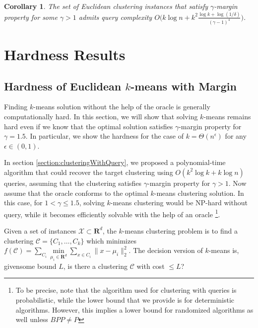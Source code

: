 \documentclass{article}
\newcommand{\mc}{\mathcal}
\newcommand{\mb}{\mathbf}
\newtheorem{corollary}[theorem]{Corollary}
\begin{document}
\begin{corollary}
The set of Euclidean clustering instances that satisfy $\gamma$-margin property for some $\gamma > 1$ admits query complexity $O\big(k\log n + k^2\frac{\log k + \log (1/\delta)}{(\gamma - 1)^4}\big)$. 
\end{corollary}

\section{Hardness Results}
\label{section:lowerBounds}

\subsection{Hardness of Euclidean $k$-means with Margin}

Finding $k$-means solution without the help of the oracle is generally computationally hard. In this section, we will show that solving $k$-means remains hard even if we know that the optimal solution satisfies $\gamma$-margin property for $\gamma=1.5$. In particular, we show the hardness for the case of $k=\Theta(n^\epsilon)$ for any $\epsilon\in (0,1)$. 

In section \ref{section:clusteringWithQuery}, we proposed a polynomial-time algorithm that could recover the target clustering using $O(k^2\log k +k\log n)$ queries, assuming that the clustering satisfies $\gamma$-margin property for $\gamma>1$. Now assume that the oracle conforms to the optimal $k$-means clustering solution. In this case, for $1<\gamma\le 1.5$, solving $k$-means clustering would be NP-hard without query, while it becomes efficiently solvable with the help of an oracle \footnote{To be precise, note that the algorithm used for clustering with queries is probabilistic, while the lower bound that we provide is for deterministic algorithms. However, this implies a lower bound for randomized algorithms as well unless $BPP\neq P$}. 

Given a set of instances $\mc X \subset \mb R ^d$, the $k$-means clustering problem is to find a clustering $\mc C = \{C_1, \ldots, C_k\}$ which minimizes $f(\mc C) = \sum\limits_{C_i} \min\limits_{\mu_i\in {\mb R}^d}\sum\limits_{x\in C_i} \|x - \mu_i \|_2^2$. The decision version of $k$-means is, givensome bound $L$, is there a clustering $\mc C$ with cost $\le L$?
\end{document}
